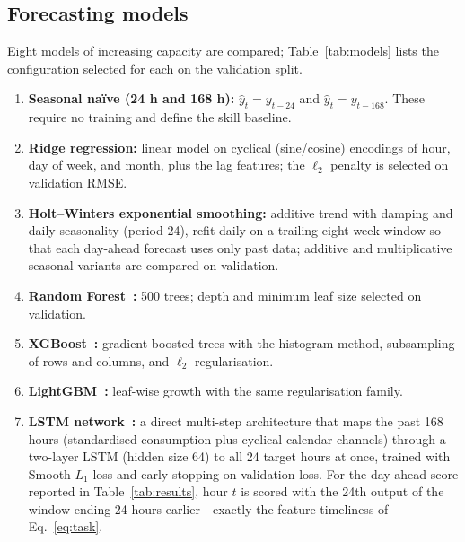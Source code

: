 \documentclass[10pt,a4paper]{article}
\begin{document}
\subsection{Forecasting models}
Eight models of increasing capacity are compared; Table~\ref{tab:models} lists the
configuration selected for each on the validation split.
\begin{enumerate}[leftmargin=1.7em,itemsep=1pt,topsep=2pt]
\item \textbf{Seasonal na\"ive (24 h and 168 h):} $\hat{y}_t = y_{t-24}$ and
      $\hat{y}_t = y_{t-168}$. These require no training and define the skill
      baseline.
\item \textbf{Ridge regression:} linear model on cyclical (sine/cosine) encodings of
      hour, day of week, and month, plus the lag features; the $\ell_2$ penalty is
      selected on validation RMSE.
\item \textbf{Holt--Winters exponential smoothing:} additive trend with damping and
      daily seasonality (period 24), refit daily on a trailing eight-week window so
      that each day-ahead forecast uses only past data; additive and multiplicative
      seasonal variants are compared on validation.
\item \textbf{Random Forest~\cite{breiman2001random}:} 500 trees; depth and minimum
      leaf size selected on validation.
\item \textbf{XGBoost~\cite{chen2016xgboost}:} gradient-boosted trees with the
      histogram method, subsampling of rows and columns, and $\ell_2$ regularisation.
\item \textbf{LightGBM~\cite{ke2017lightgbm}:} leaf-wise growth with the same
      regularisation family.
\item \textbf{LSTM network~\cite{hochreiter1997lstm}:} a direct multi-step
      architecture that maps the past 168 hours (standardised consumption plus
      cyclical calendar channels) through a two-layer LSTM (hidden size 64) to all
      24 target hours at once, trained with Smooth-$L_1$ loss and early stopping on
      validation loss. For the day-ahead score reported in
      Table~\ref{tab:results}, hour $t$ is scored with the 24th output of the window
      ending 24 hours earlier---exactly the feature timeliness of
      Eq.~\eqref{eq:task}.
\end{enumerate}
\end{document}
